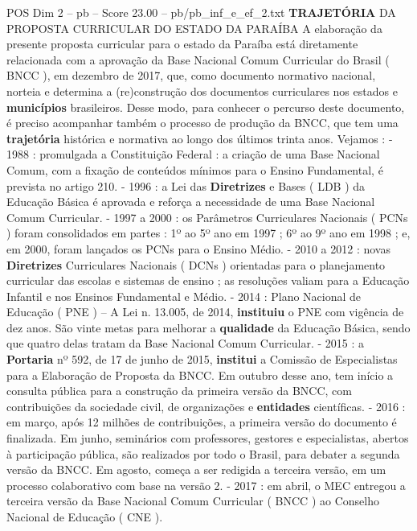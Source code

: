 \begin{textsample}{POS Dim 2 – pb – Score 23.00 – pb/pb\_inf\_e\_ef\_2.txt}  \label{ex:f2_pos_272}
\textbf{TRAJETÓRIA} DA PROPOSTA CURRICULAR DO ESTADO DA PARAÍBA A elaboração da presente proposta curricular para o estado da Paraíba está diretamente relacionada com a aprovação da Base Nacional Comum Curricular do Brasil ( BNCC ), em dezembro de 2017, que, como documento normativo nacional, norteia e determina a (re)construção dos documentos curriculares nos estados e \textbf{municípios} brasileiros.
Desse modo, para conhecer o percurso deste documento, é preciso acompanhar também o processo de produção da BNCC, que tem uma \textbf{trajetória} histórica e normativa ao longo dos últimos trinta anos.
Vejamos : - 1988 : promulgada a Constituição Federal : a criação de uma Base Nacional Comum, com a fixação de conteúdos mínimos para o Ensino Fundamental, é prevista no artigo 210. - 1996 : a Lei das \textbf{Diretrizes} e Bases ( LDB ) da Educação Básica é aprovada e reforça a necessidade de uma Base Nacional Comum Curricular. - 1997 a 2000 : os Parâmetros Curriculares Nacionais ( PCNs ) foram consolidados em partes : 1º ao 5º ano em 1997 ; 6º ao 9º ano em 1998 ; e, em 2000, foram lançados os PCNs para o Ensino Médio. - 2010 a 2012 : novas \textbf{Diretrizes} Curriculares Nacionais ( DCNs ) orientadas para o planejamento curricular das escolas e sistemas de ensino ; as resoluções valiam para a Educação Infantil e nos Ensinos Fundamental e Médio. - 2014 : Plano Nacional de Educação ( PNE ) – A Lei n. 13.005, de 2014, \textbf{instituiu} o PNE com vigência de dez anos.
São vinte metas para melhorar a \textbf{qualidade} da Educação Básica, sendo que quatro delas tratam da Base Nacional Comum Curricular. - 2015 : a \textbf{Portaria} nº 592, de 17 de junho de 2015, \textbf{institui} a Comissão de Especialistas para a Elaboração de Proposta da BNCC.
Em outubro desse ano, tem início a consulta pública para a construção da primeira versão da BNCC, com contribuições da sociedade civil, de organizações e \textbf{entidades} científicas. - 2016 : em março, após 12 milhões de contribuições, a primeira versão do documento é finalizada.
Em junho, seminários com professores, gestores e especialistas, abertos à participação pública, são realizados por todo o Brasil, para debater a segunda versão da BNCC.
Em agosto, começa a ser redigida a terceira versão, em um processo colaborativo com base na versão 2. - 2017 : em abril, o MEC entregou a terceira versão da Base Nacional Comum Curricular ( BNCC ) ao Conselho Nacional de Educação ( CNE ).

\end{textsample}
